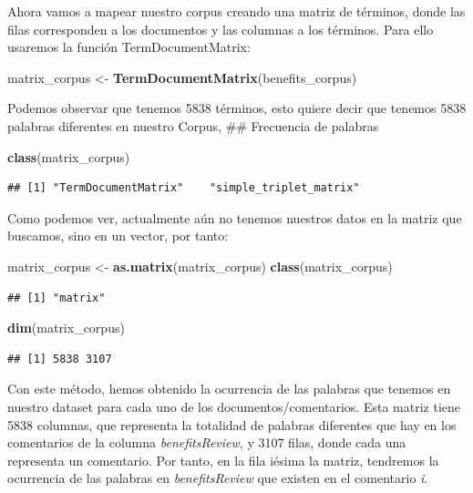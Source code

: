 \documentclass[spanish,]{article}
\newenvironment{Shaded}{\begin{snugshade}}{\end{snugshade}}
\newcommand{\KeywordTok}[1]{\textcolor[rgb]{0.13,0.29,0.53}{\textbf{#1}}}
\newcommand{\StringTok}[1]{\textcolor[rgb]{0.31,0.60,0.02}{#1}}
\newcommand{\NormalTok}[1]{#1}
\begin{document}
Ahora vamos a mapear nuestro corpus creando una matriz de términos,
donde las filas corresponden a los documentos y las columnas a los
términos. Para ello usaremos la función TermDocumentMatrix:

\begin{Shaded}
\begin{Highlighting}[]
\NormalTok{matrix_corpus <-}\StringTok{ }\KeywordTok{TermDocumentMatrix}\NormalTok{(benefits_corpus)}
\end{Highlighting}
\end{Shaded}

Podemos observar que tenemos 5838 términos, esto quiere decir que
tenemos 5838 palabras diferentes en nuestro Corpus, \#\# Frecuencia de
palabras

\begin{Shaded}
\begin{Highlighting}[]
\KeywordTok{class}\NormalTok{(matrix_corpus)}
\end{Highlighting}
\end{Shaded}

\begin{verbatim}
## [1] "TermDocumentMatrix"    "simple_triplet_matrix"
\end{verbatim}

Como podemos ver, actualmente aún no tenemos nuestros datos en la matriz
que buscamos, sino en un vector, por tanto:

\begin{Shaded}
\begin{Highlighting}[]
\NormalTok{matrix_corpus <-}\StringTok{ }\KeywordTok{as.matrix}\NormalTok{(matrix_corpus)}
\KeywordTok{class}\NormalTok{(matrix_corpus)}
\end{Highlighting}
\end{Shaded}

\begin{verbatim}
## [1] "matrix"
\end{verbatim}

\begin{Shaded}
\begin{Highlighting}[]
\KeywordTok{dim}\NormalTok{(matrix_corpus) }
\end{Highlighting}
\end{Shaded}

\begin{verbatim}
## [1] 5838 3107
\end{verbatim}

Con este método, hemos obtenido la ocurrencia de las palabras que
tenemos en nuestro dataset para cada uno de los documentos/comentarios.
Esta matriz tiene 5838 columnas, que representa la totalidad de palabras
diferentes que hay en los comentarios de la columna
\textit{benefitsReview}, y 3107 filas, donde cada una representa un
comentario. Por tanto, en la fila iésima la matriz, tendremos la
ocurrencia de las palabras en \textit{benefitsReview} que existen en el
comentario \textit{i}.
\end{document}
